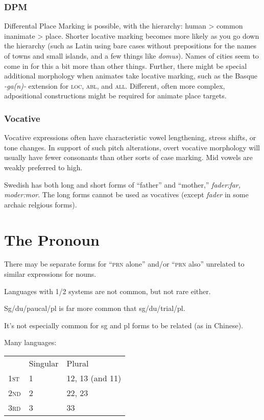 \documentclass[11pt]{article}
\newcommand{\I}[1]{\textsc{#1}}   %
\begin{document}
\subsubsection{DPM} Differental Place Marking is possible, with the
hierarchy: human > common inanimate > place.  Shorter locative marking
becomes more likely as you go down the hierarchy (such as Latin using
bare cases without prepositions for the names of towns and small
islands, and a few things like \textit{domus}).  Names of cities seem
to come in for this a bit more than other things.  Further, there
might be special additional morphology when animates take locative
marking, such as the Basque \textit{-ga(n)-} extension for \I{loc},
\I{abl}, and \I{all}.  Different, often more complex, adpositional
constructions might be required for animate place targets.

\subsubsection{Vocative} Vocative expressions often have
characteristic vowel lengthening, stress shifts, or tone changes.  In
support of such pitch alterations, overt vocative morphology will
usually have fewer consonants than other sorts of case marking.  Mid
vowels are weakly preferred to high.

Swedish has both long and short forms of ``father'' and ``mother,''
\textit{fader:far, moder:mor}.  The long forms cannot be used as
vocatives (except \textit{fader} in some archaic relgious forms).


\section{The Pronoun}
There may be separate forms for ``\I{prn} alone'' and/or ``\I{prn}
also'' unrelated to similar expressions for nouns.

Languages with 1/2 systems are not common, but not rare either.

Sg/du/paucal/pl is far more common that sg/du/trial/pl.

It's not especially common for sg and pl forms to be related (as in
Chinese).

Many languages:

\begin{center}
\begin{tabular}{lll}
  & Singular & Plural \\
\I{1st} & 1 & 12, 13 (and 11) \\
\I{2nd} & 2 & 22, 23 \\
\I{3rd} & 3 & 33
\end{tabular}
\end{center}
\end{document}
